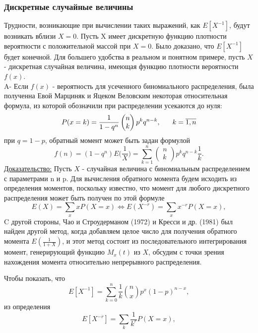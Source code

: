 \documentclass[13pt]{article}
\begin{document}
\subsubsection{Дискретные случайные величины}\label{subSection 1.1}
Трудности, возникающие при вычислении таких выражений, как $E[X^{-1}]$, будут возникать вблизи $X=0$. Пусть X имеет дискретную функцию плотности вероятности с положительной массой при $X = 0$. Было доказано, что $E [X^{-1}]$ будет конечной. Для большего удобства в реальном и понятном примере, пусть $X$ - дискретная случайная величина, имеющая функцию плотности вероятности $f(x)$.\\
A- Если $f(x)$ - вероятность для усеченного биномиального распределения, была полученна Евой Марциняк и Яцеком Веловским \cite{marciniak1999asymptotic} некоторая относительная формула, из которой обозначили при распределении усекаются до нуля:
\begin{equation}
    P(x=k) = \frac{1}{1-q^{n}} \begin{pmatrix}
    n \\
    k
    \end{pmatrix}p^{k}q^{n-k} , \hspace{6 mm} k=\overline{1,n}
\end{equation}
при $q=1-p$, обратный момент может быть задан формулой
\begin{equation}
    f(n) = (1-q^{n})E\Big(\frac{1}{X}\Big)=\sum_{k=1}^{n}\begin{pmatrix}
        n\\
        k
    \end{pmatrix}p^{k}q^{n-k}\frac{1}{k}.
\end{equation}
\underline{Доказательство:}
Пусть $X$ - случайная величина с биномиальным распределением с параметрами n и p. Для вычисления обратного момента будем исходить из определения моментов, поскольку известно, что момент для любого дискретного распределения может быть получен по этой формуле
\[
E(X) = \sum_{x}xP(X=x) \Longleftrightarrow E(X^{-r}) = \sum_{x}x^{-r}P(X=x),
\]
C другой стороны, Чао и Строудерманом (1972) \cite{chao1972negative} и Кресси и др. (1981) \cite{cressie1986moment} был найден другой метод, когда добавляем целое число для получения обратного момента $E(\frac{1}{1+X})$, и этот метод состоит из последовательного интегрирования момент, генерирующий функцию $M_x(t)$ из $X$, обсудим с точки зрения нахождения момента относительно непрерывного распределения.


Чтобы показать, что \[ E[X^{-1}] = \sum_{k=0}^{n} \frac{1}{k} \binom{n}{x} p^x (1-p)^{n-x}, \] из определения \[ E[X^{-r}] = \sum_{k}\frac{1}{k^r} P(X = x) ,\] 
\end{document}
